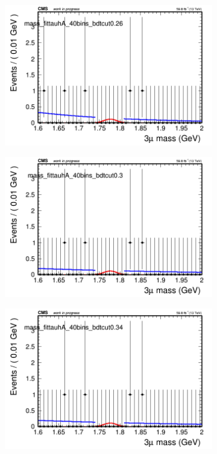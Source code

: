\begin{figure}[H]
\begin{subfigure}{0.2\textwidth}
        \includegraphics[width=\textwidth]{unfixed_exp/plots/tauhA/massfit_tauhA_40bins_bdtcut0.26.png}
        \caption{}
    \end{subfigure}
    \begin{subfigure}{0.2\textwidth}
        \includegraphics[width=\textwidth]{unfixed_exp/plots/tauhA/massfit_tauhA_40bins_bdtcut0.3.png}
        \caption{}
    \end{subfigure}
    \begin{subfigure}{0.2\textwidth}
        \includegraphics[width=\textwidth]{unfixed_exp/plots/tauhA/massfit_tauhA_40bins_bdtcut0.34.png}

\end{subfigure}
\end{figure}
